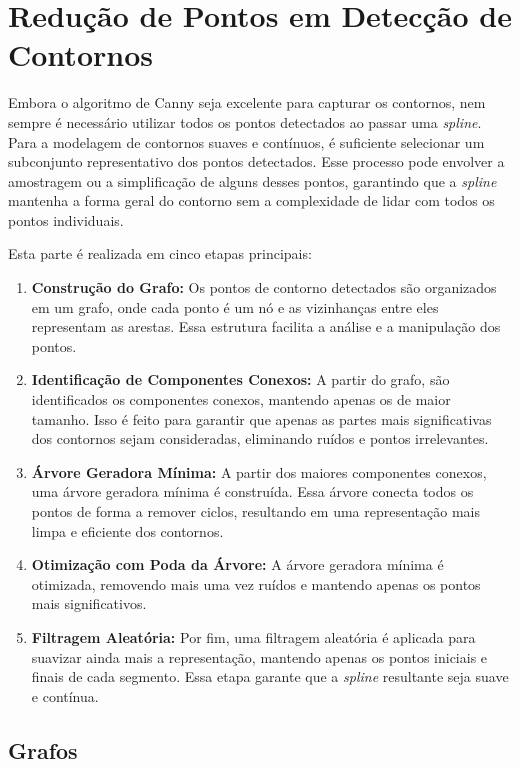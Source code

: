 
\section{Redução de Pontos em Detecção de Contornos}
\label{sec:reduzindo-pontos-deteccao-contornos}


Embora o algoritmo de Canny seja excelente para capturar os contornos, nem sempre é necessário utilizar todos os pontos detectados ao passar uma \textit{spline}. Para a modelagem de contornos suaves e contínuos, é suficiente selecionar um subconjunto representativo dos pontos detectados. Esse processo pode envolver a amostragem ou a simplificação de alguns desses pontos, garantindo que a \textit{spline} mantenha a forma geral do contorno sem a complexidade de lidar com todos os pontos individuais.

Esta parte é realizada em cinco etapas principais:
\begin{enumerate}
    \item \textbf{Construção do Grafo:} Os pontos de contorno detectados são organizados em um grafo, onde cada ponto é um nó e as vizinhanças entre eles representam as arestas. Essa estrutura facilita a análise e a manipulação dos pontos.
    \item \textbf{Identificação de Componentes Conexos:} A partir do grafo, são identificados os componentes conexos, mantendo apenas os de maior tamanho. Isso é feito para garantir que apenas as partes mais significativas dos contornos sejam consideradas, eliminando ruídos e pontos irrelevantes.
    \item \textbf{Árvore Geradora Mínima:} A partir dos maiores componentes conexos, uma árvore geradora mínima é construída. Essa árvore conecta todos os pontos de forma a remover ciclos, resultando em uma representação mais limpa e eficiente dos contornos.
    \item \textbf{Otimização com Poda da Árvore:} A árvore geradora mínima é otimizada, removendo mais uma vez ruídos e mantendo apenas os pontos mais significativos.
    \item \textbf{Filtragem Aleatória:} Por fim, uma filtragem aleatória é aplicada para suavizar ainda mais a representação, mantendo apenas os pontos iniciais e finais de cada segmento. Essa etapa garante que a \textit{spline} resultante seja suave e contínua.
\end{enumerate}

\subsection{Grafos}

